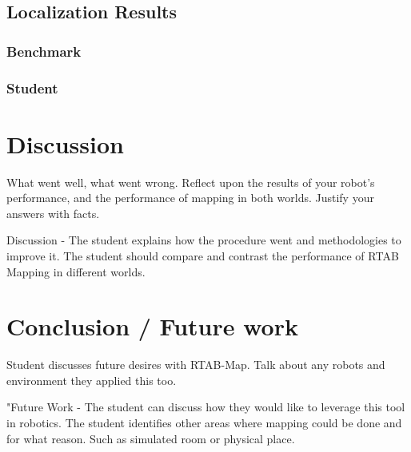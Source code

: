\documentclass[10pt,journal,compsoc]{IEEEtran}
\begin{document}
\subsection{Localization Results}
\subsubsection{Benchmark}
\subsubsection{Student}

\section{Discussion}
What went well, what went wrong. Reflect upon the results of your robot's performance, and the performance of mapping in both worlds. Justify your answers with facts.

Discussion - The student explains how the procedure went and methodologies to improve it. The student should compare and contrast the performance of RTAB Mapping in different worlds.

\section{Conclusion / Future work}
Student discusses future desires with RTAB-Map. Talk about any robots and environment they applied this too.

"Future Work - The student can discuss how they would like to leverage this tool in robotics. The student identifies other areas where mapping could be done and for what reason. Such as simulated room or physical place.



\end{document}

